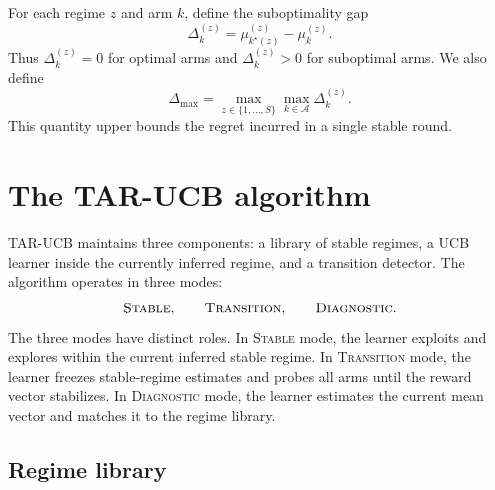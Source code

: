 \documentclass[11pt]{article}
\newcommand{\A}{\mathcal A}
\begin{document}
For each regime $z$ and arm $k$, define the suboptimality gap
\begin{equation}
\label{eq:arm_gap}
\Delta_k^{(z)}
=
\mu_{k^\star(z)}^{(z)}-\mu_k^{(z)}.
\end{equation}
Thus $\Delta_k^{(z)}=0$ for optimal arms and $\Delta_k^{(z)}>0$ for suboptimal arms. We also define
\begin{equation}
\label{eq:max_gap}
\Delta_{\max}
=
\max_{z\in\{1,\ldots,S\}}
\max_{k\in\A}
\Delta_k^{(z)}.
\end{equation}
This quantity upper bounds the regret incurred in a single stable round.

\section{The TAR-UCB algorithm}
\label{sec:algorithm}

TAR-UCB maintains three components: a library of stable regimes, a UCB learner inside the currently inferred regime, and a transition detector. The algorithm operates in three modes:
\begin{equation}
\label{eq:modes}
\textsc{Stable},
\qquad
\textsc{Transition},
\qquad
\textsc{Diagnostic}.
\end{equation}
The three modes have distinct roles. In \textsc{Stable} mode, the learner exploits and explores within the current inferred stable regime. In \textsc{Transition} mode, the learner freezes stable-regime estimates and probes all arms until the reward vector stabilizes. In \textsc{Diagnostic} mode, the learner estimates the current mean vector and matches it to the regime library.

\subsection{Regime library}
\label{subsec:regime_library}
\end{document}
